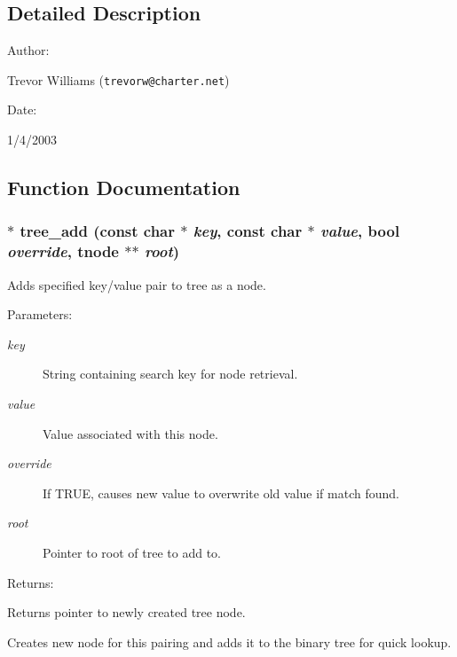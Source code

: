 \subsection{Detailed Description}


\begin{Desc}
\item[Author: ]\par
Trevor Williams ({\tt trevorw@charter.net}) \end{Desc}
\begin{Desc}
\item[Date: ]\par
1/4/2003\end{Desc}


\subsection{Function Documentation}
\subsubsection{$\ast$ tree\_\-add (const char $\ast$ {\em key}, const char $\ast$ {\em value}, {\bf bool} {\em override}, {\bf tnode} $\ast$$\ast$ {\em root})}\label{tree_8c_a0}


Adds specified key/value pair to tree as a node.

\begin{Desc}
\item[Parameters: ]\par
\begin{description}
\item[{\em 
key}]String containing search key for node retrieval. \item[{\em 
value}]Value associated with this node. \item[{\em 
override}]If TRUE, causes new value to overwrite old value if match found. \item[{\em 
root}]Pointer to root of tree to add to.\end{description}
\end{Desc}
\begin{Desc}
\item[Returns: ]\par
Returns pointer to newly created tree node.\end{Desc}
Creates new node for this pairing and adds it to the binary tree for quick lookup. 
